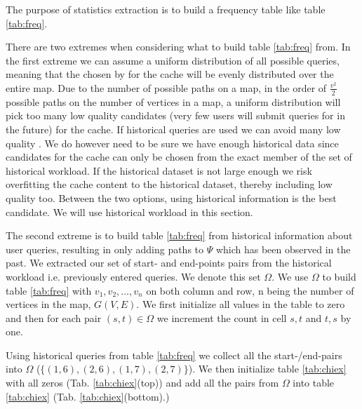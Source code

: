The purpose of statistics extraction is to build a frequency table like table \ref{tab:freq}.

There are two extremes when considering what to build table \ref{tab:freq} from. 
In the first extreme we can assume a uniform distribution of all possible queries, meaning that the \spaths chosen by \salgo for the cache will be evenly distributed over the entire map. Due to the number of possible paths on a map, in the order of $\frac{v^2}{2}$ possible paths on the number of vertices in a map, a uniform distribution will pick too many low quality candidates (\spaths very few users will submit queries for in the future) for the cache. If historical queries are used we can avoid many low quality \spathsns. We do however need to be sure we have enough historical data since candidates for the cache can only be chosen from the exact member of the set of historical workload. If the historical dataset is not large enough we risk overfitting the cache content to the historical dataset, thereby including low quality \spaths too. Between the two options, using historical information is the best candidate. We will use historical workload in this section.

The second extreme is to build table \ref{tab:freq} from historical information about user queries, resulting in \salgo only adding paths to $\Psi$ which has been observed in the past. We extracted our set of start- and end-points pairs from the historical workload i.e. previously entered \spath queries. We denote this set $\Omega$. We use $\Omega$ to build table \ref{tab:freq} with $v_1,v_2,\ldots,v_n$ on both column and row, n being the number of vertices in the map, $G(V,E)$. We first initialize all values in the table to zero and then for each pair $(s,t) \in \Omega$ we increment the count in cell $s,t$ and $t,s$ by one.

Using historical queries from table \ref{tab:freq} we collect all the start-/end-pairs into $\Omega$ ($\{(1,6),(2,6),(1,7),(2,7)\}$). We then initialize table \ref{tab:chiex} with all zeros (Tab. \ref{tab:chiex}(top)) and add all the pairs from $\Omega$ into table \ref{tab:chiex} (Tab. \ref{tab:chiex}(bottom).)

